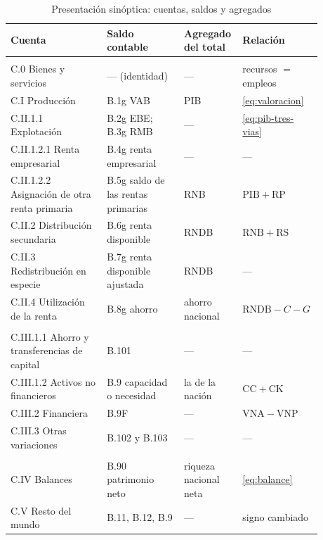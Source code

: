 \documentclass[11pt]{article}
\begin{document}
\begin{table}[H]
\centering
\caption{Presentación sinóptica: cuentas, saldos y agregados}\label{tab:sinoptica}
\small
\renewcommand{\arraystretch}{1.15}
\begin{tabular}{>{\raggedright\arraybackslash}m{0.3\linewidth}>{\raggedright\arraybackslash}m{0.24\linewidth}>{\raggedright\arraybackslash}m{0.16\linewidth}>{\raggedright\arraybackslash}m{0.18\linewidth}}
\toprule
\rowcolor{tceeazulpalido}
\textbf{Cuenta} & \textbf{Saldo contable} & \textbf{Agregado del total} & \textbf{Relación} \\
\midrule
\rowcolor{tceemoradopalido}\multicolumn{4}{l}{\textbf{Cuentas corrientes}}\\
C.0 Bienes y servicios & --- (identidad) & --- & recursos $=$ empleos \\
C.I Producción & B.1g VAB & PIB & \eqref{eq:valoracion} \\
C.II.1.1 Explotación & B.2g EBE; B.3g RMB & --- & \eqref{eq:pib-tres-vias} \\
C.II.1.2.1 Renta empresarial & B.4g renta empresarial & --- & --- \\
C.II.1.2.2 Asignación de otra renta primaria & B.5g saldo de las rentas primarias & RNB & $\mathrm{PIB}+\mathrm{RP}$ \\
C.II.2 Distribución secundaria & B.6g renta disponible & RNDB & $\mathrm{RNB}+\mathrm{RS}$ \\
C.II.3 Redistribución en especie & B.7g renta disponible ajustada & RNDB & --- \\
C.II.4 Utilización de la renta & B.8g ahorro & ahorro nacional & $\mathrm{RNDB}-C-G$ \\
\rowcolor{tceesalvia}\multicolumn{4}{l}{\textbf{Cuentas de acumulación}}\\
C.III.1.1 Ahorro y transferencias de capital & B.101 & --- & --- \\
C.III.1.2 Activos no financieros & B.9 capacidad o necesidad & la de la nación & $\mathrm{CC}+\mathrm{CK}$ \\
C.III.2 Financiera & B.9F & --- & $\mathrm{VNA}-\mathrm{VNP}$ \\
C.III.3 Otras variaciones & B.102 y B.103 & --- & --- \\
\rowcolor{tceeazulpalido}\multicolumn{4}{l}{\textbf{Balances}}\\
C.IV Balances & B.90 patrimonio neto & riqueza nacional neta & \eqref{eq:balance} \\
C.V Resto del mundo & B.11, B.12, B.9 & --- & signo cambiado \\
\bottomrule
\end{tabular}
\end{table}
\end{document}
